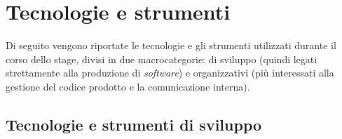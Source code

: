 \section{Tecnologie e strumenti}
\label{sec:tecnologie-e-strumenti}
Di seguito vengono riportate le tecnologie e gli strumenti utilizzati durante il corso dello stage, divisi in due macrocategorie: di sviluppo (quindi legati strettamente alla produzione di \textit{software}) e organizzativi (più interessati alla gestione del codice prodotto e la comunicazione interna).\\

\subsection{Tecnologie e strumenti di sviluppo}
